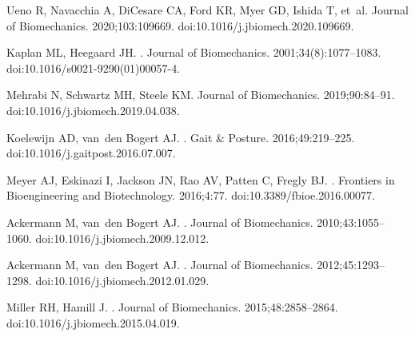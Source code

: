 \documentclass[10pt,letterpaper]{article}
\begin{document}
\begin{thebibliography}{10}
    Ueno R, Navacchia A, DiCesare CA, Ford KR, Myer GD, Ishida T, et~al.
    \newblock Journal of Biomechanics. 2020;103:109669.
    \newblock doi:{10.1016/j.jbiomech.2020.109669}.

    Kaplan ML, Heegaard JH.
    .
    \newblock Journal of Biomechanics. 2001;34(8):1077--1083.
    \newblock doi:{10.1016/s0021-9290(01)00057-4}.

    Mehrabi N, Schwartz MH, Steele KM.
    \newblock Journal of Biomechanics. 2019;90:84--91.
    \newblock doi:{10.1016/j.jbiomech.2019.04.038}.

    Koelewijn AD, van~den Bogert AJ.
    .
    \newblock Gait \& Posture. 2016;49:219--225.
    \newblock doi:{10.1016/j.gaitpost.2016.07.007}.

    Meyer AJ, Eskinazi I, Jackson JN, Rao AV, Patten C, Fregly BJ.
    .
    \newblock Frontiers in Bioengineering and Biotechnology. 2016;4:77.
    \newblock doi:{10.3389/fbioe.2016.00077}.

    Ackermann M, van~den Bogert AJ.
    .
    \newblock Journal of Biomechanics. 2010;43:1055--1060.
    \newblock doi:{10.1016/j.jbiomech.2009.12.012}.

    Ackermann M, van~den Bogert AJ.
    .
    \newblock Journal of Biomechanics. 2012;45:1293--1298.
    \newblock doi:{10.1016/j.jbiomech.2012.01.029}.

    Miller RH, Hamill J.
    .
    \newblock Journal of Biomechanics. 2015;48:2858--2864.
    \newblock doi:{10.1016/j.jbiomech.2015.04.019}.


\end{thebibliography}
\end{document}
